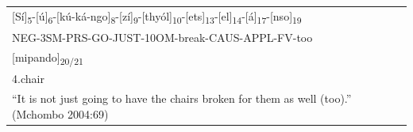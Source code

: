 \begin{tabular}{@{}l@{}}
\Large [Sí]\textsubscript{5}-[ú]\textsubscript{6}-[kú-ká-ngo]\textsubscript{8}-[zí]\textsubscript{9}-[thyól]\textsubscript{10}-[ets]\textsubscript{13}-[el]\textsubscript{14}-[á]\textsubscript{17}-[nso]\textsubscript{19} \\[4pt]
\large NEG-3SM-PRS-GO-JUST-10OM-break-CAUS-APPL-FV-too \\[12pt]
\Large [mipando]\textsubscript{20/21} \\[4pt]
\large 4.chair \\[12pt]
\parbox[t]{364.78505pt}{\raggedright\Large ``It is not just going to have the chairs broken for them as well (too).'' (Mchombo 2004:69)} \\
\end{tabular}
